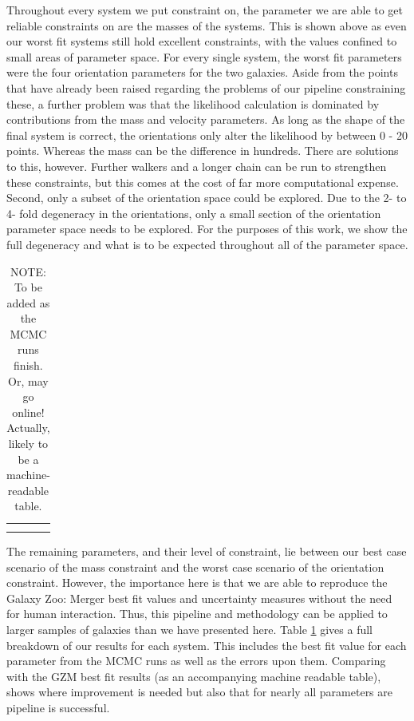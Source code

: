 Throughout every system we put constraint on, the parameter we are able to get reliable constraints on are the masses of the systems. This is shown above as even our worst fit systems still hold excellent constraints, with the values confined to small areas of parameter space. For every single system, the worst fit parameters were the four orientation parameters for the two galaxies. Aside from the points that have already been raised regarding the problems of our pipeline constraining these, a further problem was that the likelihood calculation is dominated by contributions from the mass and velocity parameters. As long as the shape of the final system is correct, the orientations only alter the likelihood by between 0 - 20 points. Whereas the mass can be the difference in hundreds. There are solutions to this, however. Further walkers and a longer chain can be run to strengthen these constraints, but this comes at the cost of far more computational expense. Second, only a subset of the orientation space could be explored. Due to the 2- to 4- fold degeneracy in the orientations, only a small section of the orientation parameter space needs to be explored. For the purposes of this work, we show the full degeneracy and what is to be expected throughout all of the parameter space.

\begin{table}[]
    \centering
    \begin{tabular}{c|c}
         &  \\
         & 
    \end{tabular}
    \caption{NOTE: To be added as the MCMC runs finish. Or, may go online! Actually, likely to be a machine-readable table.}
    \label{tab:constraints}
\end{table}

The remaining parameters, and their level of constraint, lie between our best case scenario of the mass constraint and the worst case scenario of the orientation constraint. However, the importance here is that we are able to reproduce the Galaxy Zoo: Merger best fit values and uncertainty measures without the need for human interaction. Thus, this pipeline and methodology can be applied to larger samples of galaxies than we have presented here. Table \ref{tab:constraints} gives a full breakdown of our results for each system. This includes the best fit value for each parameter from the MCMC runs as well as the errors upon them. Comparing with the GZM best fit results (as an accompanying machine readable table), shows where improvement is needed but also that for nearly all parameters are pipeline is successful. 

